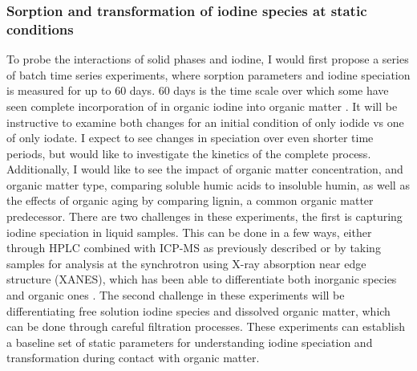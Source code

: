 \documentclass[twoside,12pt,titlepage]{article}
\begin{document}
\subsubsection{Sorption and transformation of iodine species at static conditions}
To probe the interactions of solid phases and iodine, I would first propose a series of batch time series experiments, where sorption parameters and iodine speciation is measured for up to 60 days. 60 days is the time scale over which some have seen complete incorporation of in organic iodine into organic matter \cite{Yamaguchi2008}. It will be instructive to examine both changes for an initial condition of only iodide vs one of only iodate. I expect to see changes in speciation over even shorter time periods, but would like to investigate the kinetics of the complete process. Additionally, I would like to see the impact of organic matter concentration, and organic matter type, comparing soluble humic acids to insoluble humin, as well as the effects of organic aging by comparing lignin, a common organic matter predecessor. There are two challenges in these experiments, the first is capturing iodine speciation in liquid samples. This can be done in a few ways, either through HPLC combined with ICP-MS as previously described \cite{Wuilloud2005} or by taking samples for analysis at the synchrotron using X-ray absorption near edge structure (XANES), which has been able to differentiate both inorganic species and organic ones \cite{Yamaguchi2008}. The second challenge in these experiments will be differentiating free solution iodine species and dissolved organic matter, which can be done through careful filtration processes. These experiments can establish a baseline set of static parameters for understanding iodine speciation and transformation during contact with organic matter.
\end{document}
